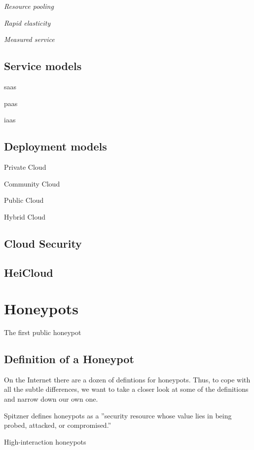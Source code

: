 \textit{Resource pooling}

\textit{Rapid elasticity}

\textit{Measured service}

\subsection{Service models}
\label{subsec:cloud-service}

\acrfull{saas}

\acrfull{paas}

\acrfull{iaas}

\subsection{Deployment models}
\label{subsec:cloud-deployment}

Private Cloud

Community Cloud

Public Cloud

Hybrid Cloud

\subsection{Cloud Security}

\cite{Nithin2012}

\subsection{HeiCloud}

\section{Honeypots}

The first public honeypot \cite{Spitzner2003}

\subsection{Definition of a Honeypot}

On the Internet there are a dozen of defintions for honeypots. Thus, to cope with all the subtle differences, we want to take a closer look at some of the definitions and narrow down our own one.

Spitzner defines honeypots as a ''security resource whose value lies in being probed, attacked, or compromised.''\cite{Spitzner2003}

High-interaction honeypots\\

